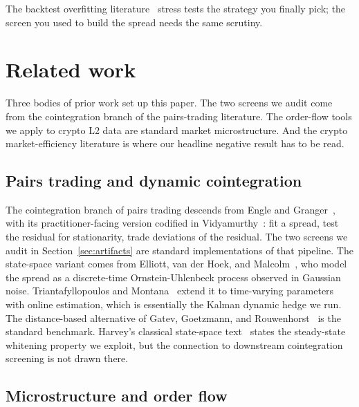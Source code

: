 \documentclass[11pt]{article}
\begin{document}
The backtest overfitting
literature~\cite{bailey2014dsr} stress tests the strategy you finally pick;
the screen you used to build the spread needs the same scrutiny.

\section{Related work}
\label{sec:related}

Three bodies of prior work set up this paper. The two screens we audit come from the
cointegration branch of the pairs-trading literature. The order-flow tools we apply to crypto
L2 data are standard market microstructure. And the crypto market-efficiency literature is
where our headline negative result has to be read.

\subsection{Pairs trading and dynamic cointegration}
\label{sec:related-pairs}

The cointegration branch of pairs trading descends from Engle and
Granger~\cite{engle1987cointegration}, with its practitioner-facing version codified in
Vidyamurthy~\cite{vidyamurthy2004pairs}: fit a spread, test the residual for stationarity,
trade deviations of the residual. The two screens we audit in Section~\ref{sec:artifacts}
are standard implementations of that pipeline. The state-space variant comes from Elliott,
van der Hoek, and Malcolm~\cite{elliott2005pairs}, who model the spread as a discrete-time
Ornstein-Uhlenbeck process observed in Gaussian noise. Triantafyllopoulos and
Montana~\cite{triantafyllopoulos2011dynamic} extend it to time-varying parameters with
online estimation, which is essentially the Kalman dynamic hedge we run. The distance-based
alternative of Gatev, Goetzmann, and Rouwenhorst~\cite{gatev2006pairs} is the standard
benchmark.
Harvey's classical state-space text~\cite{harvey1989structural} states the steady-state
whitening property we exploit, but the connection to downstream cointegration screening is
not drawn there.

\subsection{Microstructure and order flow}
\label{sec:related-micro}
\end{document}
